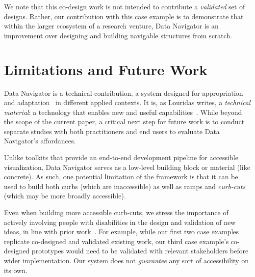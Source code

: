 \documentclass[journal]{vgtc}                %
\begin{document}

We note that this co-design work is not intended to contribute a \textit{validated} set of designs. Rather, our contribution with this case example is to demonstrate that within the larger ecosystem of a research venture, Data Navigator is an improvement over designing and building navigable structures from scratch.

\section{Limitations and Future Work}
Data Navigator is a technical contribution, a system designed for appropriation~\cite{Dourish2003Appropriation} and adaptation~\cite{Wobbrock2011Ability} in different applied contexts. It is, as Louridas writes, a \textit{technical material}: a technology that enables new and useful capabilities~\cite{Louridas1999Bricolage}. While beyond the scope of the current paper, a critical next step for future work is to conduct separate studies with both practitioners and end users to evaluate Data Navigator's affordances.

Unlike toolkits that provide an end-to-end development pipeline for accessible visualization, Data Navigator serves as a low-level building block or material (like concrete). As such, one potential limitation of the framework is that it can be used to build both curbs (which are inaccessible) as well as ramps and \textit{curb-cuts} (which may be more broadly accessible).

Even when building more accessible curb-cuts, we stress the importance of actively involving people with disabilities in the design and validation of new ideas, in line with prior work~\cite{Reid2022Curb,Lundgard2019Sociotechnical,Lundgard2022Accessible,Zong2022Rich}. For example, while our first two case examples replicate co-designed and validated existing work, our third case example's co-designed prototypes would need to be validated with relevant stakeholders before wider implementation. Our system does not \textit{guarantee} any sort of accessibility on its own.
\end{document}
